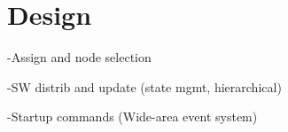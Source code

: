 \section{Design}
\label{design}



-Assign and node selection 

-SW distrib and update (state mgmt, hierarchical)

-Startup commands
  (Wide-area event system)
